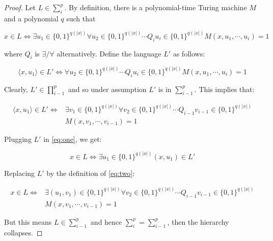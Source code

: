 \documentclass[12pt, a4paper]{article} %
\newcommand{\sumip}{\sum_i^p}
\newcommand{\sumipp}{\sum_{i-1}^p}
\newcommand{\prodipp}{\prod_{i-1}^p}
\begin{document}
\begin{proof}

  Let $L \in \sumip$. By definition, there is a polynomial-time Turing machine $M$ and a polynomial $q$ such that

  \begin{equation}\label{eq:one}
    x \in L \iff \exists u_1 \in \{0,1\}^{q(|x|)} \forall u_2 \in \{0,1\}^{q(|x|)} \cdots Q_i u_i \in \{0,1\}^{q(|x|)} M(x, u_1, \cdots, u_i) = 1
  \end{equation}

  where $Q_i$ is $\exists / \forall$ alternatively. Define the language $L'$ as follows:

  \begin{equation}
    \langle x, u_1 \rangle \in L' \iff \forall u_2 \in \{0,1\}^{q(|x|)} \cdots Q_i u_i \in \{0,1\}^{q(|x|)} M(x, u_1, \cdots, u_i) = 1
  \end{equation}

  Clearly, $L' \in \prodipp$ and so under assumption $L'$ is in $\sumipp$. This implies that:

  \begin{equation}\label{eq:two}
    \begin{split}
      \langle x, u_1 \rangle \in L' \iff & \exists v_1 \in \{0,1\}^{q(|x|)} \forall v_2 \in \{0,1\}^{q(|x|)}  \cdots Q_{i-1} v_{i-1} \in \{0,1\}^{q(|x|)} \\
      &M(x, v_1, \cdots, v_{i-1}) = 1
    \end{split}
  \end{equation}

  Plugging $L'$ in \ref{eq:one}, we get:

  \begin{equation}
    x \in L \iff \exists u_1 \in \{0,1\}^{q(|x|)} (x,u_1) \in L'
  \end{equation}

  Replacing $L'$ by the definition of \ref{eq:two}:

  \begin{equation}
    \begin{split}
      x \in L \iff & \exists(u_1, v_1) \in \{0,1\}^{q(|x|)} \forall v_2 \in \{0,1\}^{q(|x|)} \cdots Q_{i-1} v_{i-1} \in \{0,1\}^{q(|x|)} \\
      & M(x, v_1, \cdots, v_{i-1}) = 1
    \end{split}
  \end{equation}

  But this means $L \in \sumipp$ and hence $\sumip = \sumipp$, then the hierarchy collapses.

\end{proof}
\end{document}
